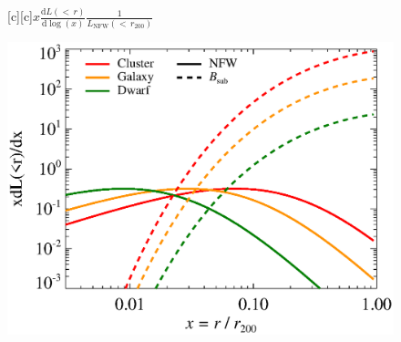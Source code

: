\documentclass[dvips]{article}
\begin{document}
\pagestyle{empty}

\newcommand{\size}{\Large}%

\begin{figure}
  [c][c]{\size $x\frac{\displaystyle \mathrm{d}L(<\,r)}{\displaystyle \mathrm{d}\log(x)}\frac{\displaystyle  1}{L_\mathrm{NFW}(\displaystyle<\,r_{200})}$}
  
    \includegraphics[width=\textwidth]{emissiv.sub_raw.eps}
\end{figure}
\end{document}

